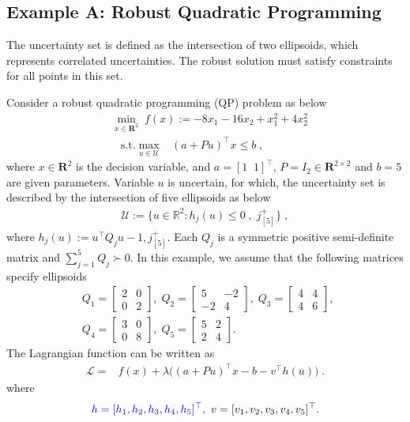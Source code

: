 \documentclass[journal,twoside,web]{ieeecolor}
\newcommand{\rev}[1]{\textcolor{revisionblue}{#1}}
\begin{document}
\subsection*{Example A: Robust Quadratic Programming}

The uncertainty set is defined as the intersection of two ellipsoids, which represents correlated uncertainties. The robust solution must satisfy constraints for all points in this set.

Consider a robust quadratic programming (QP) problem as below
\begin{align} \label{ro_simulation}
&\min_{x \in \mathbf{R}^2} \;f(x):=-8x_1-16x_2+x_1^2+4x_2^2\nonumber\\
&\;\;\;\text{s.t.} \max_{u\in \mathcal{U}} \;\;\; (a+Pu)^\top x\leq b\;,
\end{align}
where $x \in \mathbf{R}^2$ is the decision variable, and $a =[1\;\;1]^\top$, $P=I_2 \in \mathbf{R}^{2 \times 2}$ and $b=5$ are given parameters. Variable $u$ is uncertain, for which, the uncertainty set is described by the intersection of five ellipsoids as below
\begin{align*}\mathcal{U}:=\{u \in \mathbb{R}^{2}:h_{j}(u) \leq 0\;,\; j^+_{[5]}\}\;,\end{align*}
where
$h_j(u):=u^\top Q_j u-1, j^+_{[5]}$. Each $Q_{j}$ is a symmetric positive semi-definite matrix and $ \sum_{j=1}^{5} Q_j \succ 0$. In this example, we assume that the following matrices specify ellipsoids
\begin{align*}
&Q_1=\left[\begin{array}{ccl} 2 & 0\\0 & 2 \end{array}\right],\; Q_2=\left[\begin{array}{ccl} 5 & -2\\-2 & 4  \end{array}\right],\; Q_3=\left[\begin{array}{ccl} 4 & 4\\4 & 6\end{array}\right],\;\\
&Q_4=\left[\begin{array}{ccl} 3 & 0\\0 & 8 \end{array}\right],\;
Q_5=\left[\begin{array}{ccl} 5 & 2\\2 & 4 \end{array}\right].
\end{align*}
The Lagrangian function can be written as
\begin{align*}
\mathcal{L}=&f(x)+\lambda \big((a+Pu)^\top x-b-v ^\top h(u)\big)\;.
\end{align*}
where
\begin{align*}
\rev{h=[h_1,h_2,h_3,h_4,h_5]^\top} ,\ v=[v_1,v_2,v_3,v_4,v_5]^\top.
\end{align*}
\end{document}
